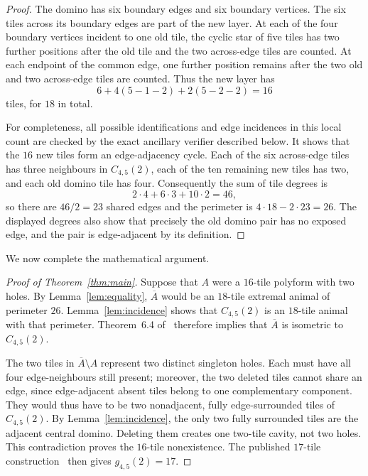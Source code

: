 \documentclass[11pt]{article}
\begin{document}
\begin{proof}
The domino has six boundary edges and six boundary vertices.  The six tiles
across its boundary edges are part of the new layer.  At each of the four
boundary vertices incident to one old tile, the cyclic star of five tiles
has two further positions after the old tile and the two across-edge tiles
are counted.  At each endpoint of the common edge, one further position
remains after the two old and two across-edge tiles are counted.  Thus the
new layer has
\[
          6+4(5-1-2)+2(5-2-2)=16
\]
tiles, for $18$ in total.

For completeness, all possible identifications and edge incidences in this
local count are checked by the exact ancillary verifier described below.
It shows that the $16$ new tiles form an edge-adjacency cycle.  Each of the
six across-edge tiles has three neighbours in $C_{4,5}(2)$, each of the ten
remaining new tiles has two, and each old domino tile has four.  Consequently
the sum of tile degrees is
\[
             2\cdot4+6\cdot3+10\cdot2=46,
\]
so there are $46/2=23$ shared edges and the perimeter is
$4\cdot18-2\cdot23=26$.  The displayed degrees also show that precisely the
old domino pair has no exposed edge, and the pair is edge-adjacent by its
definition.
\end{proof}

We now complete the mathematical argument.

\begin{proof}[Proof of Theorem~\ref{thm:main}]
Suppose that $A$ were a $16$-tile polyform with two holes.  By
Lemma~\ref{lem:equality}, $\overline A$ would be an $18$-tile extremal
animal of perimeter $26$.  Lemma~\ref{lem:incidence} shows that
$C_{4,5}(2)$ is an $18$-tile animal with that perimeter.  Theorem~6.4
of~\cite{MalenRoldanToala2023} therefore implies that $\overline A$ is
isometric to $C_{4,5}(2)$.

The two tiles in $\overline A\setminus A$ represent two distinct singleton
holes.  Each must have all four edge-neighbours still present; moreover,
the two deleted tiles cannot share an edge, since edge-adjacent absent tiles
belong to one complementary component.  They would thus have to be two
nonadjacent, fully edge-surrounded tiles of $C_{4,5}(2)$.  By
Lemma~\ref{lem:incidence}, the only two fully surrounded tiles are the
adjacent central domino.  Deleting them creates one two-tile cavity, not two
holes.  This contradiction proves the $16$-tile nonexistence.  The published
$17$-tile construction~\cite[Theorem~1.2 and Table~1]{EldridgeEtAl2026}
then gives $g_{4,5}(2)=17$.
\end{proof}
\end{document}
